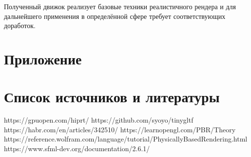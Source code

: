 \documentclass[a4paper,14pt]{extarticle}
\begin{document}
Полученный движок реализует базовые техники реалистичного рендера и для дальнейшего применения
в определённой сфере требует соответствующих доработок. 

\section{Приложение}

\section{Список источников и литературы}

https://gpuopen.com/hiprt/
https://github.com/syoyo/tinygltf
https://habr.com/en/articles/342510/
https://learnopengl.com/PBR/Theory
https://reference.wolfram.com/language/tutorial/PhysicallyBasedRendering.html
https://www.sfml-dev.org/documentation/2.6.1/
\end{document}
